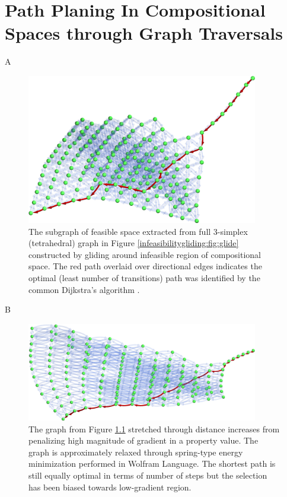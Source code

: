 \chapter{Path Planing In Compositional Spaces through Graph Traversals} \label{chap:pathplanning}

A

\begin{figure}[h]
    \centering
    \includegraphics[width=0.9\textwidth]{pathplanning/InfeasibilityGliding_Feasible.png}
    \caption{The subgraph of feasible space extracted from full 3-simplex (tetrahedral) graph in Figure \ref{infeasibilitygliding:fig:glide} constructed by gliding around infeasible region of compositional space. The red path overlaid over directional edges indicates the optimal (least number of transitions) path was identified by the common Dijkstra's algorithm \cite{Dijkstra1959AGraphs}.}
    \label{fig:shortestpath}
\end{figure}

B
\citet{Tandoc2023MiningAlloys}

\begin{figure}[h]
    \centering
    \includegraphics[width=0.9\textwidth]{pathplanning/InfeasibilityGliding_LowGradient.png}
    \caption{The graph from Figure \ref{fig:shortestpath} stretched through distance increases from penalizing high magnitude of gradient in a property value. The graph is approximately relaxed through spring-type energy minimization performed in Wolfram Language. The shortest path is still equally optimal in terms of number of steps but the selection has been biased towards low-gradient region.}
    \label{fig:lowgradient}
\end{figure}

